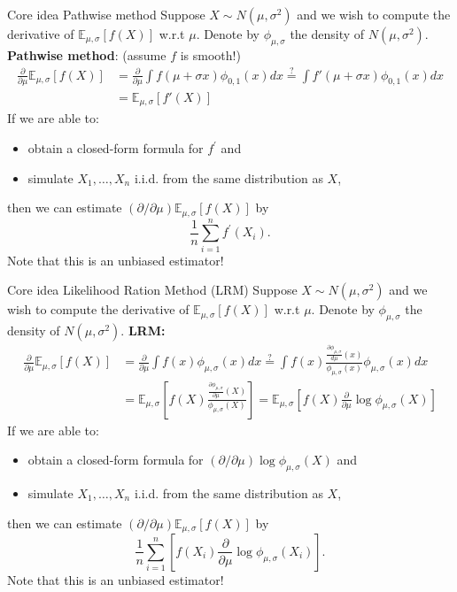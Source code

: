 \documentclass[pdf, handout]{beamer}
\begin{document}
\begin{frame}{Core idea Pathwise method}
Suppose $X \sim N(\mu,\sigma^2)$ and we wish to compute the derivative of $\mathbb{E}_{\mu,\sigma}[f(X)]$ w.r.t $\mu$. Denote by $\phi_{\mu,\sigma}$ the density of $N(\mu,\sigma^2)$.
\vskip4mm
\textbf{Pathwise method}: (assume $f$ is smooth!)
\begin{align*}
\frac{\partial}{\partial\mu} \mathbb{E}_{\mu,\sigma}[f(X)] &= \frac{\partial}{\partial\mu} \int f(\mu+\sigma x) \phi_{0,1}(x) dx \stackrel{?}{=} \int f'(\mu+\sigma x) \phi_{0,1}(x) dx \\
&= \mathbb{E}_{\mu,\sigma}[ f'(X)]
\end{align*} 
If we are able to:
\begin{itemize}
\item obtain a closed-form formula for $f^\prime$ and
\item simulate $X_1,\dots,X_n$ i.i.d. from the same distribution as $X$,
\end{itemize}
then we can estimate $(\partial/\partial\mu) \mathbb{E}_{\mu,\sigma}[f(X)]$ by
\[
\frac{1}{n}\sum_{i=1}^n f^\prime(X_i).
\]
Note that this is an unbiased estimator!
\end{frame}

\begin{frame}{Core idea Likelihood Ration Method (LRM)}
Suppose $X \sim N(\mu,\sigma^2)$ and we wish to compute the derivative of $\mathbb{E}_{\mu,\sigma}[f(X)]$ w.r.t $\mu$. Denote by $\phi_{\mu,\sigma}$ the density of $N(\mu,\sigma^2)$.
\vskip4mm
\textbf{LRM:}
\begin{align*}
\frac{\partial}{\partial\mu} \mathbb{E}_{\mu,\sigma}[f(X)] &= \frac{\partial}{\partial\mu} \int f(x) \phi_{\mu,\sigma}(x) dx \stackrel{?}{=} \int f(x) \frac{\frac{\partial  \phi_{\mu,\sigma}}{d\mu}(x)}{\phi_{\mu,\sigma}(x)} \phi_{\mu,\sigma}(x) dx
\\
&= \mathbb{E}_{\mu,\sigma}\left[f(X) \frac{\frac{\partial  \phi_{\mu,\sigma}}{\partial\mu}(X)}{\phi_{\mu,\sigma}(X)}  \right]
= 
\mathbb{E}_{\mu,\sigma}\left[f(X) \frac{\partial}{\partial\mu} \log  \phi_{\mu,\sigma}(X)  \right]
\end{align*}
If we are able to:
\begin{itemize}
\item obtain a closed-form formula for $(\partial/\partial\mu) \log  \phi_{\mu,\sigma}(X)$ and
\item simulate $X_1,\dots,X_n$ i.i.d. from the same distribution as $X$,
\end{itemize}
then we can estimate $(\partial/\partial\mu) \mathbb{E}_{\mu,\sigma}[f(X)]$ by
\[
\frac{1}{n}\sum_{i=1}^n
\left[
 f(X_i) \frac{\partial}{\partial\mu} \log  \phi_{\mu,\sigma}(X_i)\right].
\]
Note that this is an unbiased estimator!
\end{frame}
\end{document}
